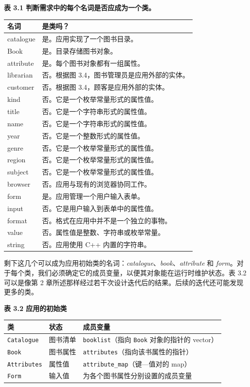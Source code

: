 \begin{center}
{\bfseries 表 3.1 判断需求中的每个名词是否应成为一个类。}\par\vspace{3bp}
\begin{tabularx}{\textwidth}{XX}
\toprule
名词 & 是类吗？ \\
\midrule
catalogue & 是。应用实现了一个图书目录。 \\
Book & 是。目录存储图书对象。 \\
attribute & 是。每个图书对象都有一组属性。 \\
librarian & 否。根据图 3.4，图书管理员是应用外部的实体。 \\
customer & 否。根据图 3.4，顾客是应用外部的实体。 \\
kind & 否。它是一个枚举常量形式的属性值。 \\
title & 否。它是一个字符串形式的属性值。 \\
name & 否。它是一个字符串形式的属性值。 \\
year & 否。它是一个整数形式的属性值。 \\
genre & 否。它是一个枚举常量形式的属性值。 \\
region & 否。它是一个枚举常量形式的属性值。 \\
subject & 否。它是一个枚举常量形式的属性值。 \\
browser & 否。应用与现有的浏览器协同工作。 \\
form & 是。应用管理一个用户输入表单。 \\
input & 否。它是用户输入到表单中的属性值。 \\
format & 否。格式在应用中并不是一个独立的事物。 \\
value & 否。属性值是整数、字符串或枚举常量。 \\
string & 否。应用使用 C++ 内置的字符串。 \\
\bottomrule
\end{tabularx}
\end{center}

剩下这几个可以成为应用初始类的名词：\emph{catalogue}、\emph{book}、\emph{attribute} 和 \emph{form}。对于每个类，我们必须确定它的成员变量，以便其对象能在运行时维护状态。表 3.2 可以是像第 2 章所述那样经过若干次设计迭代后的结果。后续的迭代还可能发现更多的类。

\begin{center}
{\bfseries 表 3.2 应用的初始类}\par\vspace{3bp}
\begin{tabularx}{\textwidth}{XXX}
\toprule
类 & 状态 & 成员变量 \\
\midrule
\texttt{Catalogue} & 图书清单 & \texttt{booklist}（指向 \texttt{Book} 对象的指针的 vector） \\
\texttt{Book} & 图书属性 & \texttt{attributes}（指向该书属性的指针） \\
\texttt{Attributes} & 属性值 & \texttt{attribute\_\allowbreak{}}\texttt{map}（键—值对的 map） \\
\texttt{Form} & 输入值 & 为各个图书属性分别设置的成员变量 \\
\bottomrule
\end{tabularx}
\end{center}

